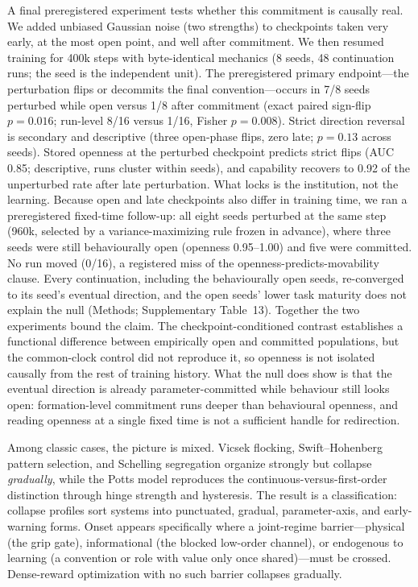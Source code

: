 \documentclass[11pt]{article}
\begin{document}
A final preregistered experiment tests whether this commitment is
causally real. We added unbiased Gaussian noise (two strengths) to
checkpoints taken very early, at the most open point, and well after
commitment. We then resumed training for 400k steps with
byte-identical mechanics (8 seeds, 48 continuation runs; the seed is
the independent unit). The preregistered primary endpoint---the
perturbation flips or decommits the final convention---occurs in 7/8
seeds perturbed while open versus 1/8 after commitment (exact paired
sign-flip $p=0.016$; run-level 8/16 versus 1/16, Fisher $p=0.008$).
Strict direction reversal is secondary and descriptive (three
open-phase flips, zero late; $p=0.13$ across seeds). Stored openness
at the perturbed checkpoint predicts strict flips (AUC 0.85;
descriptive, runs cluster within seeds), and capability recovers to
0.92 of the unperturbed rate after late perturbation. What locks is
the institution, not the learning. Because open
and late checkpoints also differ in training time, we ran a
preregistered fixed-time follow-up: all eight seeds perturbed at the
same step (960k, selected by a variance-maximizing rule frozen in
advance), where three seeds were still behaviourally open (openness
0.95--1.00) and five were committed. No run moved (0/16), a registered
miss of the openness-predicts-movability clause. Every continuation,
including the behaviourally open seeds, re-converged to its seed's
eventual direction, and the open seeds' lower task maturity does not
explain the null (Methods; Supplementary Table~13). Together the two
experiments bound the claim. The checkpoint-conditioned contrast
establishes a functional difference between empirically open and
committed populations, but the common-clock control did not reproduce
it, so openness is not isolated causally from the rest of training
history. What the null does show is that the eventual direction is
already parameter-committed while behaviour still looks open:
formation-level commitment runs deeper than behavioural openness, and
reading openness at a single fixed time is not a sufficient handle
for redirection.

Among classic cases, the picture is mixed. Vicsek
flocking\citep{vicsek1995novel}, Swift--Hohenberg pattern
selection\citep{cross1993pattern}, and Schelling
segregation\citep{schelling1971dynamic} organize strongly but collapse
\emph{gradually}, while the Potts model\citep{wu1982potts} reproduces
the continuous-versus-first-order distinction through hinge strength
and hysteresis. The result is a classification: collapse profiles sort
systems into punctuated, gradual, parameter-axis, and early-warning
forms. Onset appears specifically where a joint-regime barrier---physical
(the grip gate), informational (the blocked low-order channel), or
endogenous to learning (a convention or role with value only once
shared)---must be crossed. Dense-reward optimization with no such
barrier collapses gradually.
\end{document}
